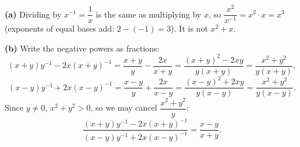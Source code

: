 \textbf{(a)} Dividing by $x^{-1}=\dfrac1x$ is the same as multiplying by $x$, so $\dfrac{x^2}{x^{-1}}=x^2\cdot x=\boxed{x^3}$ (exponents of equal bases add: $2-(-1)=3$). It is not $x^2+x$.

\textbf{(b)} Write the negative powers as fractions:
\[(x+y)y^{-1}-2x(x+y)^{-1}=\dfrac{x+y}{y}-\dfrac{2x}{x+y}=\dfrac{(x+y)^2-2xy}{y(x+y)}=\dfrac{x^2+y^2}{y(x+y)},\]
\[(x-y)y^{-1}+2x(x-y)^{-1}=\dfrac{x-y}{y}+\dfrac{2x}{x-y}=\dfrac{(x-y)^2+2xy}{y(x-y)}=\dfrac{x^2+y^2}{y(x-y)}.\]
Since $y\ne0$, $x^2+y^2>0$, so we may cancel $\dfrac{x^2+y^2}{y}$:
\[\dfrac{(x+y)y^{-1}-2x(x+y)^{-1}}{(x-y)y^{-1}+2x(x-y)^{-1}}=\boxed{\dfrac{x-y}{x+y}}.\]
